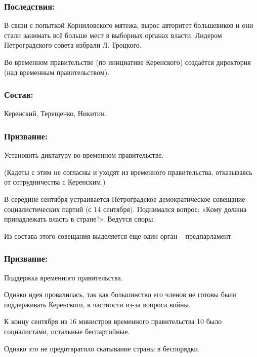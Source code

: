 \subsubsection{\textbf{Последствия:}}

В связи с попыткой Корниловского мятежа, вырос авторитет большевиков и они стали занимать всё больше мест в выборных органах власти. Лидером Петроградского совета избрали Л. Троцкого.

Во временном правительстве (по инициативе Керенского) создаётся директория (над временным правительством).

\subsubsection{\textbf{Состав:}}

Керенский, Терещенко, Никитин.

\subsubsection{\textbf{Призвание:}}

Установить диктатуру во временном правительстве.

(Кадеты с этим не согласны и уходят из временного правительства, отказываясь от сотрудничества с Керенским.)

В середине сентября устраивается Петроградское демократическое совещание социалистических партий (с 14 сентября). Поднимался вопрос: «Кому должна принадлежать власть в стране?». Ведутся споры.

Из состава этого совещания выделяется еще один орган – предпарламент.

\subsubsection{\textbf{Призвание:}}
 
Поддержка временного правительства.

Однако идея провалилась, так как большинство его членов не готовы были поддерживать Керенского, в частности из-за вопроса войны.

К концу сентября из 16 министров временного правительства 10 было социалистами, остальные беспартийные.

Однако это не предотвратило скатывание страны в беспорядки.